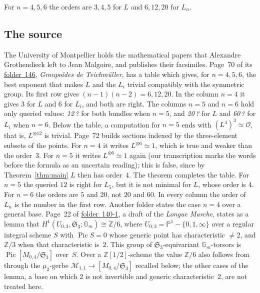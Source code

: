 \documentclass[11pt,a4paper]{amsart}
\theoremstyle{remark}
\newcommand{\Sn}{\mathfrak S}
\newcommand{\Pic}{\operatorname{Pic}}
\newcommand{\PP}{\mathbb P^1}
\newcommand{\fac}[1]{\href{https://grothendieck.umontpellier.fr/#1.pdf}{folder~#1}}
\begin{document}
For $n = 4, 5, 6$ the orders are $3, 4, 5$ for $L$ and $6, 12, 20$ for $L_n$.

\subsection*{The source}
The University of Montpellier holds the mathematical papers that Alexandre Grothendieck left to Jean Malgoire, and publishes their facsimiles. Page~70 of its \fac{146}, \emph{Groupo\"ides de Teichm\"uller}, has a table which gives, for $n = 4, 5, 6$, the best exponent that makes $L$ and the $L_i$ trivial compatibly with the symmetric group. Its first row gives $(n-1)(n-2) = 6, 12, 20$. In the column $n = 4$ it gives $3$ for $L$ and $6$ for $L_i$, and both are right. The columns $n = 5$ and $n = 6$ hold only queried values: \emph{12\,?} for both bundles when $n = 5$, and \emph{20\,?} for $L$ and \emph{60\,?} for $L_i$ when $n = 6$. Below the table, a computation for $n = 5$ ends with $(L^4)^3 \simeq \mathcal O$, that is, $L^{\otimes 12}$ is trivial. Page~72 builds sections indexed by the three-element subsets of the points. For $n = 4$ it writes $L^{\otimes 6} \simeq 1$, which is true and weaker than the order~$3$. For $n = 5$ it writes $L^{\otimes 6} \simeq 1$ again (our transcription marks the words before the formula as an uncertain reading); this is false, since by Theorem~\ref{thm:main} $L$ then has order~$4$. The theorem completes the table. For $n = 5$ the queried $12$ is right for $L_5$, but it is not minimal for $L$, whose order is $4$. For $n = 6$ the orders are $5$ and $20$, not $20$ and $60$. In every column the order of $L_n$ is the number in the first row. Another folder states the case $n = 4$ over a general base. Page~22 of \fac{140-1}, a draft of the \emph{Longue Marche}, states as a lemma that $H^1(U_{0,3}, \Sn_3; \mathbb G_m) \cong \mathbb Z/6$, where $U_{0,3} = \PP - \{0, 1, \infty\}$ over a regular integral scheme $S$ with $\Pic S = 0$ whose generic point has characteristic $\neq 2$, and $\mathbb Z/3$ when that characteristic is~$2$. This group of $\Sn_3$-equivariant $\mathbb G_m$-torsors is $\Pic[M_{0,4}/\Sn_3]$ over~$S$. Over a $\mathbb Z[1/2]$-scheme the value $\mathbb Z/6$ also follows from \cite[Th.~1.1]{fultonolsson2010} through the $\mu_2$-gerbe $\mathcal M_{1,1} \to [M_{0,4}/\Sn_3]$ recalled below; the other cases of the lemma, a base on which $2$ is not invertible and generic characteristic~$2$, are not treated here.
\end{document}
